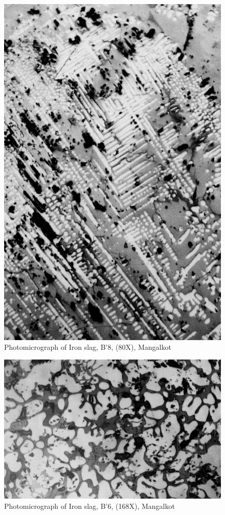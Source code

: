 \begin{figure}[H]
\renewcommand{\thefigure}{19B}
\includegraphics[scale=0.65]{images/chapter-4/fig019B.jpg}
\caption{Photomicrograph of Iron slag, B’8, (80X), Mangalkot}\label{chapter-4-fig19B}
\end{figure}
\begin{figure}[H]
\renewcommand{\thefigure}{19C}
\includegraphics[scale=0.65]{images/chapter-4/fig019C.jpg}
\caption{Photomicrograph of Iron slag, B’6, (168X), Mangalkot}\label{chapter-4-fig19C}
\end{figure}

